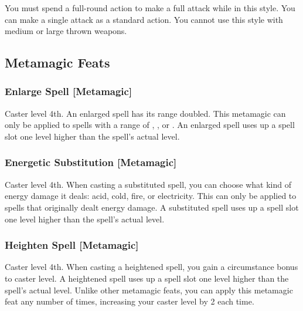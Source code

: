 You must spend a full-round action to make a full attack while in this style. You can make a single attack as a standard action. You cannot use this style with medium or large thrown weapons.

\subsection{Metamagic Feats}


\subsubsection{Enlarge Spell [Metamagic]}
 Caster level 4th.
 An enlarged spell has its range doubled. This metamagic can only be applied to spells with a range of \rngclose, \rngmed, or \rnglong. An enlarged spell uses up a spell slot one level higher than the spell's actual level.

\begin{comment}
\subsubsection{Extend Spell [Metamagic]}
\parhead{Prerequisite} Caster level 8th.
\parhead{Benefit} An extended spell has its duration increased by one duration category: from Short, to Medium, to Long, to Extreme. This metamagic can only be applied to spells with a duration of \durshort, \durmed, or \durlong. An extended spell uses up a spell slot three levels higher than the spell's actual level.
\end{comment}

\subsubsection{Energetic Substitution [Metamagic]}
 Caster level 4th.
 When casting a substituted spell, you can choose what kind of energy damage it deals: acid, cold, fire, or electricity. This can only be applied to spells that originally dealt energy damage. A substituted spell uses up a spell slot one level higher than the spell's actual level.

\subsubsection{Heighten Spell [Metamagic]}
 Caster level 4th.
 When casting a heightened spell, you gain a  circumstance bonus to caster level. A heightened spell uses up a spell slot one level higher than the spell's actual level. Unlike other metamagic feats, you can apply this metamagic feat any number of times, increasing your caster level by 2 each time.

